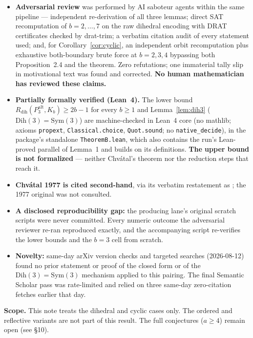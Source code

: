 \documentclass[11pt]{article}
\theoremstyle{definition}
\newcommand{\Dih}{\mathrm{Dih}}
\newcommand{\Sym}{\mathrm{Sym}}
\newcommand{\Rdih}{R_{\mathrm{dih}}}
\newcommand{\Palt}{P_3^{\mathrm{alt}}}
\begin{document}
\begin{itemize}
\item \textbf{Adversarial review} was performed by AI saboteur agents within the
  same pipeline --- independent re-derivation of all three lemmas; direct SAT
  recomputation of $b = 2,\ldots,7$ on the raw dihedral encoding with DRAT
  certificates checked by drat-trim; a verbatim citation audit of every
  \cite{DD26} statement used; and, for Corollary~\ref{cor:cyclic}, an independent
  orbit recomputation plus exhaustive both-boundary brute force at $b = 2, 3, 4$
  bypassing both Proposition~2.4 and the theorem. Zero refutations; one
  immaterial tally slip in motivational text was found and corrected.
  \textbf{No human mathematician has reviewed these claims.}

\item \textbf{Partially formally verified (Lean~4).} The lower bound
  $\Rdih(\Palt, K_b) \ge 2b-1$ for every $b \ge 1$ and Lemma~\ref{lem:dih3}
  ($\Dih(3) = \Sym(3)$) are machine-checked in Lean~4 core (no mathlib; axioms
  \texttt{propext}, \texttt{Classical.choice}, \texttt{Quot.sound}; no
  \texttt{native\_decide}), in the package's standalone \texttt{TheoremB.lean},
  which also contains the run's Lean-proved parallel of Lemma~1 and builds on
  its definitions. \textbf{The upper bound is not formalized} --- neither
  Chv\'atal's theorem nor the reduction steps that reach it.

\item \textbf{Chv\'atal 1977 is cited second-hand}, via its verbatim restatement
  as \cite[Theorem~4.13]{DD26}; the 1977 original was not consulted.

\item \textbf{A disclosed reproducibility gap:} the producing lane's original
  scratch scripts were never committed. Every numeric outcome the adversarial
  reviewer re-ran reproduced exactly, and the accompanying script re-verifies
  the lower bounds and the $b=3$ cell from scratch.

\item \textbf{Novelty:} same-day arXiv version checks and targeted searches
  (2026-08-12) found no prior statement or proof of the closed form or of the
  $\Dih(3) = \Sym(3)$ mechanism applied to this pairing. The final Semantic
  Scholar pass was rate-limited and relied on three same-day zero-citation
  fetches earlier that day.
\end{itemize}

\medskip\noindent\textbf{Scope.}\quad
This note treats the dihedral and cyclic cases only. The ordered and reflective
variants are not part of this result. The full conjectures ($a \ge 4$) remain open
(see \S10).
\end{document}
